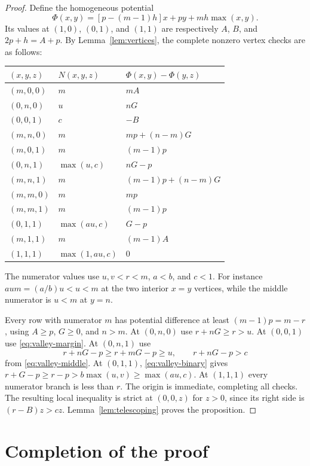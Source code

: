 \documentclass[11pt,a4paper]{article}
\theoremstyle{remark}
\begin{document}
\begin{proof}
Define the homogeneous potential
\begin{equation}\label{eq:valley-potential}
 \Phi(x,y)=[p-(m-1)h]x+py+mh\max(x,y).
\end{equation}
Its values at $(1,0)$, $(0,1)$, and $(1,1)$ are respectively
$A$, $B$, and $2p+h=A+p$.
By Lemma~\ref{lem:vertices}, the complete nonzero vertex checks are
as follows:
\begin{center}
\renewcommand{\arraystretch}{1.35}
\begin{tabular}{@{}lll@{}}
\toprule
$(x,y,z)$ & $N(x,y,z)$ & $\Phi(x,y)-\Phi(y,z)$\\
\midrule
$(m,0,0)$ & $m$ & $mA$\\
$(0,n,0)$ & $u$ & $nG$\\
$(0,0,1)$ & $c$ & $-B$\\
$(m,n,0)$ & $m$ & $mp+(n-m)G$\\
$(m,0,1)$ & $m$ & $(m-1)p$\\
$(0,n,1)$ & $\max(u,c)$ & $nG-p$\\
$(m,n,1)$ & $m$ & $(m-1)p+(n-m)G$\\
$(m,m,0)$ & $m$ & $mp$\\
$(m,m,1)$ & $m$ & $(m-1)p$\\
$(0,1,1)$ & $\max(au,c)$ & $G-p$\\
$(m,1,1)$ & $m$ & $(m-1)A$\\
$(1,1,1)$ & $\max(1,au,c)$ & $0$\\
\bottomrule
\end{tabular}
\end{center}
The numerator values use $u,v<r<m$, $a<b$, and $c<1$.
For instance $aum=(a/b)u<u<m$ at the two interior $x=y$ vertices,
while the middle numerator is $u<m$ at $y=n$.

Every row with numerator $m$ has potential difference at least
$(m-1)p=m-r$, using $A\ge p$, $G\ge0$, and $n>m$.
At $(0,n,0)$ use $r+nG\ge r>u$.
At $(0,0,1)$ use \eqref{eq:valley-margin}.
At $(0,n,1)$ use
\[
 r+nG-p\ge r+mG-p\ge u,\qquad r+nG-p>c
\]
from \eqref{eq:valley-middle}.
At $(0,1,1)$, \eqref{eq:valley-binary} gives
$r+G-p\ge r-p>b\max(u,v)\ge\max(au,c)$.
At $(1,1,1)$ every numerator branch is less than $r$.
The origin is immediate, completing all checks.
The resulting local inequality is strict at $(0,0,z)$ for $z>0$,
since its right side is $(r-B)z>cz$.
Lemma~\ref{lem:telescoping} proves the proposition.
\end{proof}

\section{Completion of the proof}
\end{document}
